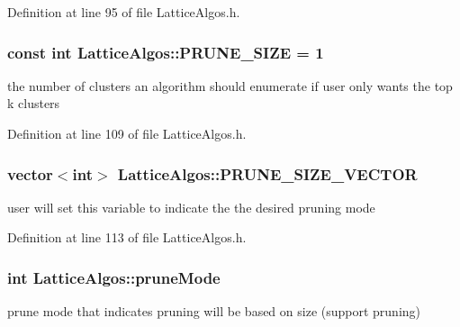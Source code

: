 Definition at line 95 of file LatticeAlgos.h.

\hypertarget{class_lattice_algos_a9a1d69347724b131f372706322776bbb}{
\subsubsection[{PRUNE\_\-SIZE}]{\setlength{\rightskip}{0pt plus 5cm}const int {\bf LatticeAlgos::PRUNE\_\-SIZE} = 1}}
\label{class_lattice_algos_a9a1d69347724b131f372706322776bbb}


the number of clusters an algorithm should enumerate if user only wants the top k clusters 



Definition at line 109 of file LatticeAlgos.h.

\hypertarget{class_lattice_algos_a244d9a63307846c2df232091a78a6759}{
\subsubsection[{PRUNE\_\-SIZE\_\-VECTOR}]{\setlength{\rightskip}{0pt plus 5cm}vector$<$int$>$ {\bf LatticeAlgos::PRUNE\_\-SIZE\_\-VECTOR}}}
\label{class_lattice_algos_a244d9a63307846c2df232091a78a6759}


user will set this variable to indicate the the desired pruning mode 



Definition at line 113 of file LatticeAlgos.h.

\hypertarget{class_lattice_algos_a5a4badfea96f02f89d8943ca7fecc2ab}{
\subsubsection[{pruneMode}]{\setlength{\rightskip}{0pt plus 5cm}int {\bf LatticeAlgos::pruneMode}}}
\label{class_lattice_algos_a5a4badfea96f02f89d8943ca7fecc2ab}


prune mode that indicates pruning will be based on size (support pruning) 



